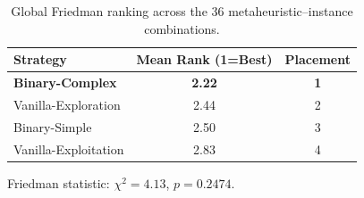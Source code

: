 \begin{table}[htbp]
  \centering
  \caption{Global Friedman ranking across the 36 metaheuristic--instance combinations.}
  \label{tab:friedman_inst0}
  \begin{tabular}{lcc}
    \toprule
    \textbf{Strategy} &
    \textbf{Mean Rank (1=Best)} &
    \textbf{Placement} \\
    \midrule
    \textbf{Binary-Complex}          & \textbf{2.22} & \textbf{1} \\
    Vanilla-Exploration              &   2.44 &  2 \\
    Binary-Simple                    &   2.50 &  3 \\
    Vanilla-Exploitation             &   2.83 &  4 \\
    \bottomrule
  \end{tabular}
  \vspace{1ex}

  \footnotesize Friedman statistic:
  $\chi^2=4.13$, $p=0.2474$.
\end{table}
